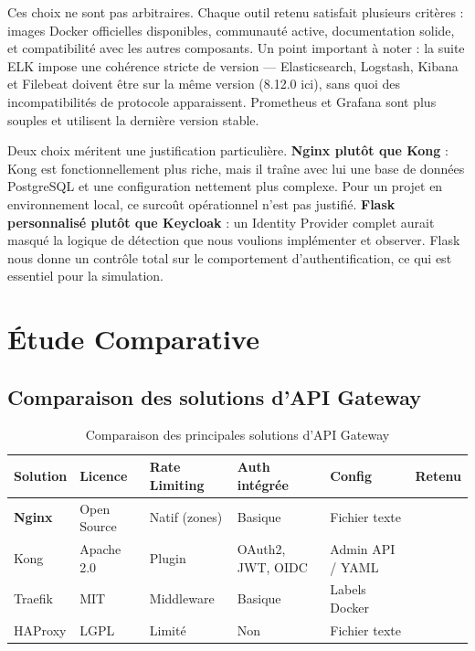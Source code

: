 \documentclass[12pt, a4paper]{report}
\newcommand{\cmark}{\ding{51}}
\newcommand{\xmark}{\ding{55}}
\begin{document}
\medskip
Ces choix ne sont pas arbitraires. Chaque outil retenu satisfait plusieurs critères : images Docker officielles disponibles, communauté active, documentation solide, et compatibilité avec les autres composants. Un point important à noter : la suite ELK impose une cohérence stricte de version — Elasticsearch, Logstash, Kibana et Filebeat doivent être sur la même version (8.12.0 ici), sans quoi des incompatibilités de protocole apparaissent. Prometheus et Grafana sont plus souples et utilisent la dernière version stable.

Deux choix méritent une justification particulière. \textbf{Nginx plutôt que Kong} : Kong est fonctionnellement plus riche, mais il traîne avec lui une base de données PostgreSQL et une configuration nettement plus complexe. Pour un projet en environnement local, ce surcoût opérationnel n'est pas justifié. \textbf{Flask personnalisé plutôt que Keycloak} : un Identity Provider complet aurait masqué la logique de détection que nous voulions implémenter et observer. Flask nous donne un contrôle total sur le comportement d'authentification, ce qui est essentiel pour la simulation.

\section{Étude Comparative}

\subsection{Comparaison des solutions d'API Gateway}

\begin{table}[H]
  \centering
  \caption{Comparaison des principales solutions d'API Gateway}
  \begin{tabularx}{\textwidth}{@{}lXXXXX@{}}
    \toprule
    \textbf{Solution} & \textbf{Licence} & \textbf{Rate Limiting} & \textbf{Auth intégrée} & \textbf{Config} & \textbf{Retenu} \\
    \midrule
    \textbf{Nginx}   & Open Source & Natif (zones) & Basique & Fichier texte & \cmark \\
    Kong             & Apache 2.0  & Plugin        & OAuth2, JWT, OIDC & Admin API / YAML & \xmark \\
    Traefik          & MIT         & Middleware    & Basique           & Labels Docker & \xmark \\
    HAProxy          & LGPL        & Limité        & Non               & Fichier texte & \xmark \\
    \bottomrule
  \end{tabularx}
\end{table}
\end{document}
